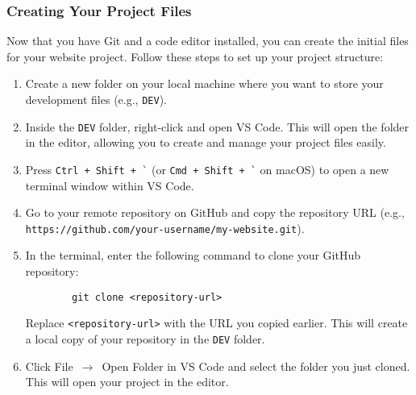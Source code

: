 \subsubsection{Creating Your Project Files}
Now that you have Git and a code editor installed, you can create the initial files for your website project. Follow these steps to set up your project structure:
\begin{enumerate}
    \item Create a new folder on your local machine where you want to store your development files (e.g., \texttt{DEV}).
    \item Inside the \texttt{DEV} folder, right-click and open VS Code. This will open the folder in the editor, allowing you to create and manage your project files easily.
    \item Press \texttt{Ctrl~+~Shift~+~\`} (or \texttt{Cmd~+~Shift~+~\`} on macOS) to open a new terminal window within VS Code.%
    \item Go to your remote repository on GitHub and copy the repository URL (e.g., \texttt{https://github.com/your-username/my-website.git}).
    \item In the terminal, enter the following command to clone your GitHub repository:
    \begin{verbatim}
        git clone <repository-url>
    \end{verbatim}
    Replace \texttt{<repository-url>} with the URL you copied earlier. This will create a local copy of your repository in the \texttt{DEV} folder.
    \item Click File~$\rightarrow$~Open Folder in VS Code and select the folder you just cloned. This will open your project in the editor.
\end{enumerate}

